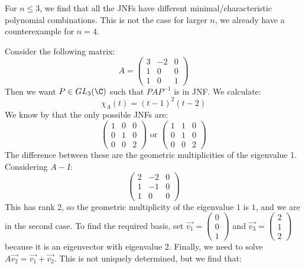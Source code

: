 \documentclass[../Main.tex]{subfiles}
\begin{document}
\begin{remark}
    For $n \leq 3$, we find that all the JNFs have different minimal/characteristic polynomial combinations. This is not the case for larger $n$, we already have a counterexample for $n = 4$.
\end{remark}
\begin{example}
    Consider the following matrix:
    \begin{equation*}
        A =
        \begin{pmatrix}
            3 & -2 & 0 \\
            1 & 0 & 0 \\
            1 & 0 & 1
        \end{pmatrix}
    \end{equation*}
    Then we want $P \in GL_3(\C)$ such that $PAP^{-1}$ is in JNF. We calculate:
    \begin{equation*}
        \chi_A(t) = (t-1)^2 (t-2)
    \end{equation*}
    We know by  that the only possible JNFs are:
    \begin{equation*}
        \begin{pmatrix}
            1 & 0 & 0 \\
            0 & 1 & 0 \\
            0 & 0 & 2
        \end{pmatrix}
        \text{ or }
        \begin{pmatrix}
            1 & 1 & 0 \\
            0 & 1 & 0 \\
            0 & 0 & 2
        \end{pmatrix}
    \end{equation*}
    The difference between these are the geometric multiplicities of the eigenvalue 1. Considering $A - I$:
    \begin{equation*}
        \begin{pmatrix}
            2 & -2 & 0 \\
            1 & -1 & 0 \\
            1 & 0 & 0
        \end{pmatrix}
    \end{equation*}
    This has rank 2, so the geometric multiplicity of the eigenvalue $1$ is $1$, and we are in the second case. To find the required basis, set $\vec{v_1} = \begin{pmatrix}0 \\ 0 \\ 1\end{pmatrix}$ and $\vec{v_3} = \begin{pmatrix}2 \\ 1 \\ 2\end{pmatrix}$ because it is an eigenvector with eigenvalue $2$. Finally, we need to solve $A \vec{v_2} = \vec{v_1} + \vec{v_2}$. This is not uniquely determined, but we find that:

\end{example}
\end{document}
